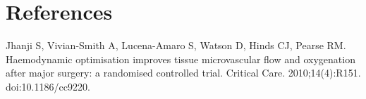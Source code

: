 \documentclass[twoside,10.5pt]{article}
\begin{document}

\section*{References}
Jhanji S, Vivian-Smith A, Lucena-Amaro S, Watson D, Hinds CJ, Pearse RM. Haemodynamic optimisation improves tissue microvascular flow and oxygenation after major surgery: a randomised controlled trial. Critical Care. 2010;14(4):R151. doi:10.1186/cc9220.
\end{document}
